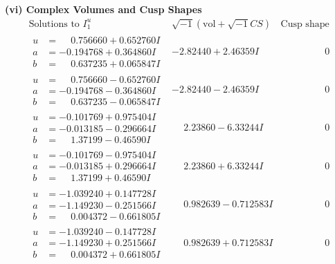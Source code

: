 \documentclass[1p]{elsarticle_modified}
\theoremstyle{definition}
\newcommand{\I}{\sqrt{-1}}
\begin{document}
\newpage\flushleft \textbf{(vi) Complex Volumes and Cusp Shapes}
$$\begin{array}{c|c|c}  
\text{Solutions to }I^u_{1}& \I (\text{vol} + \sqrt{-1}CS) & \text{Cusp shape}\\
 \hline 
\begin{aligned}
u &= \phantom{-}0.756660 + 0.652760 I \\
a &= -0.194768 + 0.364860 I \\
b &= \phantom{-}0.637235 + 0.065847 I\end{aligned}
 & -2.82440 + 2.46359 I & \phantom{-0.000000 } 0 \\ \hline\begin{aligned}
u &= \phantom{-}0.756660 - 0.652760 I \\
a &= -0.194768 - 0.364860 I \\
b &= \phantom{-}0.637235 - 0.065847 I\end{aligned}
 & -2.82440 - 2.46359 I & \phantom{-0.000000 } 0 \\ \hline\begin{aligned}
u &= -0.101769 + 0.975404 I \\
a &= -0.013185 - 0.296664 I \\
b &= \phantom{-}1.37199 - 0.46590 I\end{aligned}
 & \phantom{-}2.23860 - 6.33244 I & \phantom{-0.000000 } 0 \\ \hline\begin{aligned}
u &= -0.101769 - 0.975404 I \\
a &= -0.013185 + 0.296664 I \\
b &= \phantom{-}1.37199 + 0.46590 I\end{aligned}
 & \phantom{-}2.23860 + 6.33244 I & \phantom{-0.000000 } 0 \\ \hline\begin{aligned}
u &= -1.039240 + 0.147728 I \\
a &= -1.149230 - 0.251566 I \\
b &= \phantom{-}0.004372 - 0.661805 I\end{aligned}
 & \phantom{-}0.982639 - 0.712583 I & \phantom{-0.000000 } 0 \\ \hline\begin{aligned}
u &= -1.039240 - 0.147728 I \\
a &= -1.149230 + 0.251566 I \\
b &= \phantom{-}0.004372 + 0.661805 I\end{aligned}
 & \phantom{-}0.982639 + 0.712583 I & \phantom{-0.000000 } 0 \\ \hline\begin{aligned}

\end{aligned}
\end{array}$$
\end{document}
